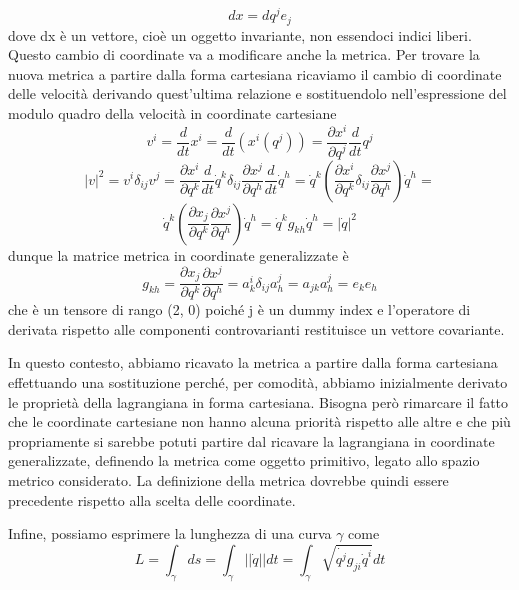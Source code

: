\documentclass[
10pt, %
a4paper, %
oneside, %
headinclude,footinclude, %
BCOR5mm, %
]{scrartcl}
\begin{document}
\[dx =  dq^j e_j\]
dove dx è un vettore, cioè un oggetto invariante, non essendoci indici liberi. \\
Questo cambio di coordinate va a modificare anche la metrica. Per trovare la nuova metrica a partire dalla forma cartesiana ricaviamo il cambio di coordinate delle velocità derivando quest'ultima relazione e sostituendolo nell'espressione del modulo quadro della velocità in coordinate cartesiane
\[v^i = \frac{d}{dt}x^i =  \frac{d}{dt}(x^i(q^j)) = \frac{\partial x^i}{\partial q^j}\frac{d}{dt}q^j\]
\[|v|^2 = v^i \delta_{ij} v^j = \frac{\partial x^i}{\partial q^k}\frac{d}{dt}\dot{q}^k \delta_{ij}  \frac{\partial x^j}{\partial q^h}\frac{d}{dt}\dot{q}^h = 
\dot{q}^k\left( \frac{\partial x^i}{\partial q^k}\delta_{ij} \frac{\partial x^j}{\partial q^h}\right)\dot{q}^h=\]
\[\dot{q}^k\left( \frac{\partial x_j}{\partial q^k} \frac{\partial x^j}{\partial q^h}\right)\dot{q}^h = \dot{q}^kg_{kh}\dot{q}^h=|\dot{q}|^2\]
dunque la matrice metrica in coordinate generalizzate è 
\[g_{kh} = \frac{\partial x_j}{\partial q^k} \frac{\partial x^j}{\partial q^h} = a_k^i\delta_{ij}a^j_h = a_{jk}a^j_h =e_ke_h\]
che è un tensore di rango (2, 0) poiché j è un dummy index e l'operatore di derivata rispetto alle componenti controvarianti restituisce un vettore covariante.
\begin{osservazione}
	In questo contesto, abbiamo ricavato la metrica a partire dalla forma cartesiana effettuando una sostituzione perché, per comodità, abbiamo inizialmente derivato le proprietà della lagrangiana in forma cartesiana. Bisogna però rimarcare il fatto che le coordinate cartesiane non hanno alcuna priorità rispetto alle altre e che più propriamente si sarebbe potuti partire dal ricavare la lagrangiana in coordinate generalizzate, definendo la metrica come oggetto primitivo, legato allo spazio metrico considerato. La definizione della metrica dovrebbe quindi essere precedente rispetto alla scelta delle coordinate.
\end{osservazione}
Infine, possiamo esprimere la lunghezza di una curva \(\gamma\) come
\[L = \int_\gamma ds =\int_\gamma ||\dot{q}||dt = \int_\gamma \sqrt{\dot{q^j}g_{ji}\dot{q}^i}dt\]
\end{document}
